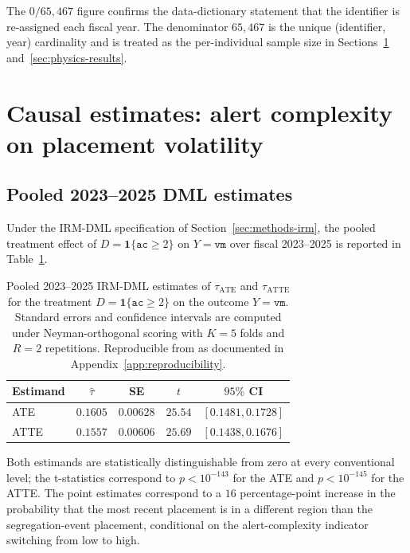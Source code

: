 \documentclass[article,shortnames,nojss]{jss}
\newcommand{\ac}{\texttt{ac}}
\newcommand{\vm}{\texttt{vm}}
\begin{document}
The $0/65{,}467$ figure confirms the data-dictionary statement that
the identifier is re-assigned each fiscal year. The denominator
$65{,}467$ is the unique (identifier, year) cardinality and is
treated as the per-individual sample size in
Sections~\ref{sec:dml} and~\ref{sec:physics-results}.

\section{Causal estimates: alert complexity on placement volatility}
\label{sec:dml}

\subsection{Pooled 2023--2025 DML estimates}
\label{sec:dml-pooled}

Under the IRM-DML specification of Section~\ref{sec:methods-irm}, the
pooled treatment effect of $D = \mathbf{1}\{\ac \ge 2\}$ on
$Y = \vm$ over fiscal 2023--2025 is reported in
Table~\ref{tab:res-pool}.

\begin{table}[h]
\centering
\caption{Pooled 2023--2025 IRM-DML estimates of $\tau_{\mathrm{ATE}}$
and $\tau_{\mathrm{ATTE}}$ for the treatment
$D = \mathbf{1}\{\ac \ge 2\}$ on the outcome $Y = \vm$. Standard
errors and confidence intervals are computed under
Neyman-orthogonal scoring with $K=5$ folds and $R=2$ repetitions.
Reproducible from  as documented in
Appendix~\ref{app:reproducibility}.}
\label{tab:res-pool}
\begin{tabular}{lcccc}
\toprule
Estimand & $\hat{\tau}$ & SE & $t$ & $95\%$ CI \\
\midrule
ATE  & $0.1605$ & $0.00628$ & $25.54$ & $[0.1481, 0.1728]$ \\
ATTE & $0.1557$ & $0.00606$ & $25.69$ & $[0.1438, 0.1676]$ \\
\bottomrule
\end{tabular}
\end{table}

Both estimands are statistically distinguishable from zero at every
conventional level; the t-statistics correspond to $p < 10^{-143}$
for the ATE and $p < 10^{-145}$ for the ATTE. The point estimates
correspond to a $16$ percentage-point increase in the probability
that the most recent placement is in a different region than the
segregation-event placement, conditional on the alert-complexity
indicator switching from low to high.
\end{document}
